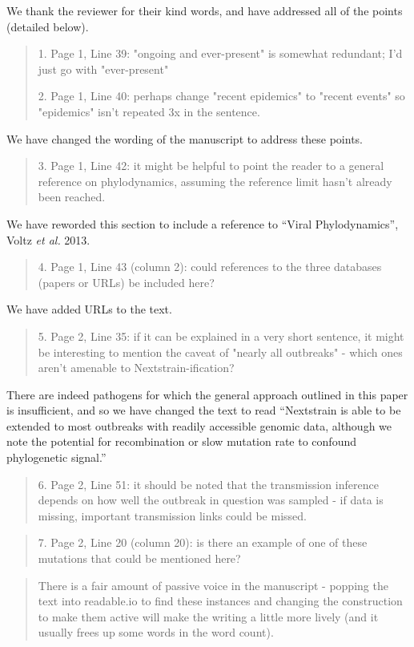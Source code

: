 \documentclass[12pt,a4paper]{article}
\begin{document}
We thank the reviewer for their kind words, and have addressed all of the points (detailed below).

\begin{quote}
1. Page 1, Line 39: "ongoing and ever-present" is somewhat redundant; I'd just go with "ever-present"

2. Page 1, Line 40: perhaps change "recent epidemics" to "recent events" so "epidemics" isn't repeated 3x in the sentence.
\end{quote}

We have changed the wording of the manuscript to address these points. 

\begin{quote}
3. Page 1, Line 42: it might be helpful to point the reader to a general reference on phylodynamics, assuming the reference limit hasn't already been reached.
\end{quote}
We have reworded this section to include a reference to ``Viral Phylodynamics'', Voltz \textit{et al.} 2013.

\begin{quote}
4. Page 1, Line 43 (column 2): could references to the three databases (papers or URLs) be included here?
\end{quote}
We have added URLs to the text.

\begin{quote}
5. Page 2, Line 35: if it can be explained in a very short sentence, it might be interesting to mention the caveat of "nearly all outbreaks" - which ones aren't amenable to Nextstrain-ification?
\end{quote}
There are indeed pathogens for which the general approach outlined in this paper is insufficient, and so we have changed the text to read ``Nextstrain is able to be extended to most outbreaks with readily accessible genomic data, although we note the potential for recombination or slow mutation rate to confound phylogenetic signal.''


\begin{quote}
6. Page 2, Line 51: it should be noted that the transmission inference depends on how well the outbreak in question was sampled - if data is missing, important transmission links could be missed.
\end{quote}


\begin{quote}
7. Page 2, Line 20 (column 20): is there an example of one of these mutations that could be mentioned here?
\end{quote}


\begin{quote}
There is a fair amount of passive voice in the manuscript - popping the text into readable.io to find these instances and changing the construction to make them active will make the writing a little more lively (and it usually frees up some words in the word count).

\end{quote}
\end{document}
